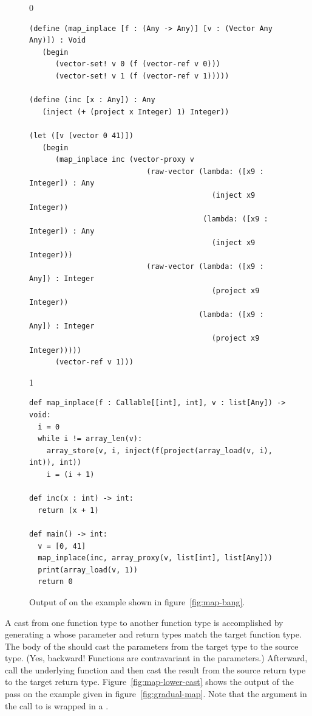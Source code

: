 \documentclass[7x10]{TimesAPriori_MIT}%
\def\racketEd{0}
\def\pythonEd{1}
\providecommand{\BookEdition}{1}
\let\edition\BookEdition
\newcommand{\pythonColor}[0]{}
\numberwithin{theorem}{chapter}
\numberwithin{definition}{chapter}
\numberwithin{equation}{chapter}
\begin{document}
\begin{figure}[tbp]
\begin{tcolorbox}[colback=white]  
{\if\edition\racketEd    
\begin{lstlisting}
(define (map_inplace [f : (Any -> Any)] [v : (Vector Any Any)]) : Void
   (begin 
      (vector-set! v 0 (f (vector-ref v 0)))
      (vector-set! v 1 (f (vector-ref v 1)))))
  
(define (inc [x : Any]) : Any
   (inject (+ (project x Integer) 1) Integer))

(let ([v (vector 0 41)])
   (begin 
      (map_inplace inc (vector-proxy v
                           (raw-vector (lambda: ([x9 : Integer]) : Any
                                          (inject x9 Integer))
                                        (lambda: ([x9 : Integer]) : Any
                                          (inject x9 Integer)))
                           (raw-vector (lambda: ([x9 : Any]) : Integer
                                          (project x9 Integer))
                                       (lambda: ([x9 : Any]) : Integer
                                          (project x9 Integer)))))
      (vector-ref v 1)))
\end{lstlisting}
\fi}
{\if\edition\pythonEd\pythonColor
\begin{lstlisting}[basicstyle=\ttfamily\footnotesize]
def map_inplace(f : Callable[[int], int], v : list[Any]) -> void:
  i = 0
  while i != array_len(v):
    array_store(v, i, inject(f(project(array_load(v, i), int)), int))
    i = (i + 1)

def inc(x : int) -> int:
  return (x + 1)

def main() -> int:
  v = [0, 41]
  map_inplace(inc, array_proxy(v, list[int], list[Any]))
  print(array_load(v, 1))
  return 0
\end{lstlisting}
\fi}
\end{tcolorbox}

\caption{Output of  on the example shown in
  figure~\ref{fig:map-bang}.}
\label{fig:map-bang-lower-cast}
\end{figure}

A cast from one function type to another function type is accomplished
by generating a  whose parameter and return types match
the target function type. The body of the  should cast
the parameters from the target type to the source type. (Yes,
backward! Functions are contravariant
in the parameters.) Afterward, call the underlying function and then
cast the result from the source return type to the target return type.
Figure~\ref{fig:map-lower-cast} shows the output of the
 pass on the  example given in
figure~\ref{fig:gradual-map}. Note that the  argument in the
call to  is wrapped in a .
\end{document}
